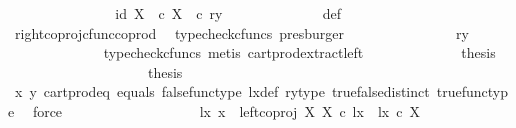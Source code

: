 \begin{isabellebody}
\ \ \ \ \ \ \ \ \ \ \isamarkupfalse%
\ \isamarkupfalse%
\ {\isachardoublequoteopen}{\isachardot}{\kern0pt}{\isachardot}{\kern0pt}{\isachardot}{\kern0pt}\ {\isacharequal}{\kern0pt}\ {\isasymlangle}id\ X{\isacharcomma}{\kern0pt}\ {\isasymf}\ {\isasymcirc}\isactrlsub c\ {\isasymbeta}\isactrlbsub X\isactrlesub {\isasymrangle}\ \ {\isasymcirc}\isactrlsub c\ ry{\isachardoublequoteclose}\isanewline
\ \ \ \ \ \ \ \ \ \ \ \ \isamarkupfalse%
\ {\isasymrho}{\isacharunderscore}{\kern0pt}def\ \ \isamarkupfalse%
\ right{\isacharunderscore}{\kern0pt}coproj{\isacharunderscore}{\kern0pt}cfunc{\isacharunderscore}{\kern0pt}coprod\ \isamarkupfalse%
\ {\isacharparenleft}{\kern0pt}typecheck{\isacharunderscore}{\kern0pt}cfuncs{\isacharcomma}{\kern0pt}\ presburger{\isacharparenright}{\kern0pt}\isanewline
\ \ \ \ \ \ \ \ \ \ \isamarkupfalse%
\ \isamarkupfalse%
\ {\isachardoublequoteopen}{\isachardot}{\kern0pt}{\isachardot}{\kern0pt}{\isachardot}{\kern0pt}\ {\isacharequal}{\kern0pt}\ {\isasymlangle}ry{\isacharcomma}{\kern0pt}\ {\isasymf}{\isasymrangle}{\isachardoublequoteclose}\isanewline
\ \ \ \ \ \ \ \ \ \ \ \ \isamarkupfalse%
\ {\isacharparenleft}{\kern0pt}typecheck{\isacharunderscore}{\kern0pt}cfuncs{\isacharcomma}{\kern0pt}\ metis\ cart{\isacharunderscore}{\kern0pt}prod{\isacharunderscore}{\kern0pt}extract{\isacharunderscore}{\kern0pt}left{\isacharparenright}{\kern0pt}\isanewline
\ \ \ \ \ \ \ \ \ \ \isamarkupfalse%
\ \isamarkupfalse%
\ {\isacharquery}{\kern0pt}thesis\isacommand{{\isachardot}{\kern0pt}}\isamarkupfalse%
\isanewline
\ \ \ \ \ \ \ \ \isamarkupfalse%
\isanewline
\ \ \ \ \ \ \ \ \isamarkupfalse%
\ \isamarkupfalse%
\ {\isacharquery}{\kern0pt}thesis\isanewline
\ \ \ \ \ \ \ \ \ \ \isamarkupfalse%
\ {\isasymrho}x\ {\isasymrho}y\ cart{\isacharunderscore}{\kern0pt}prod{\isacharunderscore}{\kern0pt}eq{}\ equals\ false{\isacharunderscore}{\kern0pt}func{\isacharunderscore}{\kern0pt}type\ lx{\isacharunderscore}{\kern0pt}def\ ry{\isacharunderscore}{\kern0pt}type\ true{\isacharunderscore}{\kern0pt}false{\isacharunderscore}{\kern0pt}distinct\ true{\isacharunderscore}{\kern0pt}func{\isacharunderscore}{\kern0pt}type\ \isamarkupfalse%
\ force\isanewline
\ \ \ \ \ \ \isamarkupfalse%
\isanewline
\ \ \ \ \isamarkupfalse%
\isanewline
\ \ \ \ \ \ \isamarkupfalse%
\ {\isachardoublequoteopen}{\isasymnexists}lx{\isachardot}{\kern0pt}\ x\ {\isacharequal}{\kern0pt}\ left{\isacharunderscore}{\kern0pt}coproj\ X\ X\ {\isasymcirc}\isactrlsub c\ lx\ {\isasymand}\ lx\ {\isasymin}\isactrlsub c\ X{\isachardoublequoteclose}\isanewline

\end{isabellebody}
